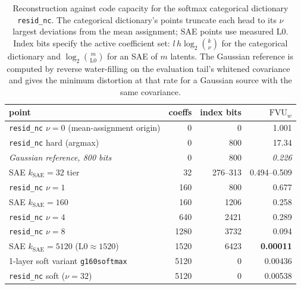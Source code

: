\begin{table}[tp]\centering\small
\begin{tabular}{@{}lrrr@{}}
\toprule
point & coeffs & index bits & $\mathrm{FVU}_w$ \\
\midrule
\texttt{resid\_nc} $\nu{=}0$ (mean-assignment origin) & 0 & 0 & 1.001 \\
\texttt{resid\_nc} hard (argmax)    & 0 & 800 & 17.34 \\
\emph{Gaussian reference, 800 bits} & 0 & 800 & \emph{0.226} \\
SAE $k_{\mathrm{SAE}}{=}32$ tier    & 32 & 276--313 & 0.494--0.509 \\
\texttt{resid\_nc} $\nu{=}1$        & 160 & 800 & 0.677 \\
SAE $k_{\mathrm{SAE}}{=}160$        & 160 & 1206 & 0.258 \\
\texttt{resid\_nc} $\nu{=}4$        & 640 & 2421 & 0.289 \\
\texttt{resid\_nc} $\nu{=}8$        & 1280 & 3732 & 0.094 \\
SAE $k_{\mathrm{SAE}}{=}5120$ ($\mathrm{L0}{\approx}1520$) & 1520 & 6423 & \textbf{0.00011} \\
1-layer soft variant \texttt{g160softmax} & 5120 & 0 & 0.00436 \\
\texttt{resid\_nc} soft ($\nu{=}32$) & 5120 & 0 & 0.00538 \\
\bottomrule
\end{tabular}
\caption{Reconstruction against code capacity for the softmax
categorical dictionary \texttt{resid\_nc}. The categorical dictionary's
points truncate each head to its $\nu$ largest deviations from the mean
assignment; SAE points use measured $\mathrm{L0}$. Index bits specify the
active coefficient set: $l\,h\log_2\binom{k}{\nu}$ for the categorical
dictionary and
$\log_2\binom{m}{\mathrm{L0}}$ for an SAE of $m$ latents. The Gaussian
reference is computed by reverse water-filling on the evaluation tail's
whitened covariance~\cite[Thm.~10.3.3]{cover2006} and gives the minimum
distortion at that rate for a Gaussian source with the same covariance.}
\label{tab:prelim-pareto}
\end{table}

